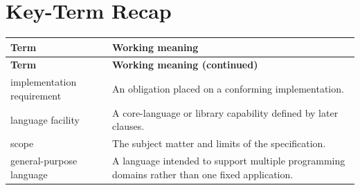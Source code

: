 \documentclass[11pt,letterpaper]{article}
\begin{document}
\section{Key-Term Recap}
\begin{longtable}{@{}>{\RaggedRight\arraybackslash}p{}>{\RaggedRight\arraybackslash}p{}@{}}\toprule\textbf{Term} & \textbf{Working meaning}\\\midrule\endfirsthead\toprule\textbf{Term} & \textbf{Working meaning (continued)}\\\midrule\endhead\bottomrule\endfoot
implementation requirement & An obligation placed on a conforming implementation.\\
language facility & A core-language or library capability defined by later clauses.\\
scope & The subject matter and limits of the specification.\\
general-purpose language & A language intended to support multiple programming domains rather than one fixed application.\\
\end{longtable}
\end{document}
